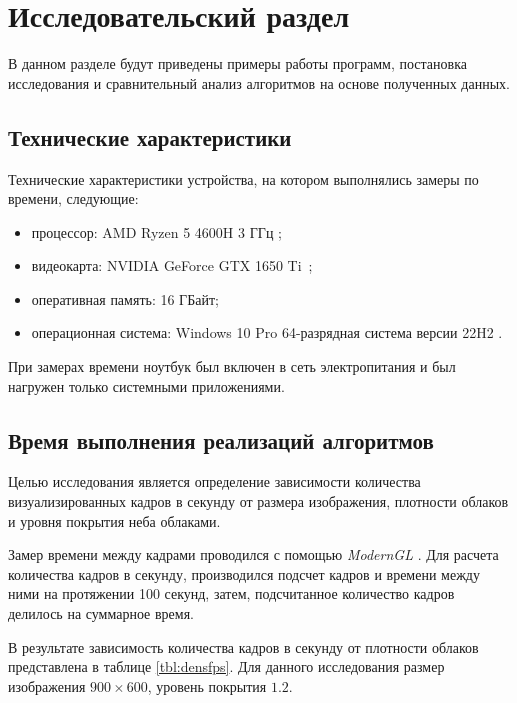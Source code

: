 \chapter{Исследовательский раздел}

В данном разделе будут приведены примеры работы программ, постановка исследования и сравнительный анализ алгоритмов на основе полученных данных.

\section{Технические характеристики}

Технические характеристики устройства, на котором выполнялись замеры по времени, следующие:
\begin{itemize}
	\item процессор: AMD Ryzen 5 4600H 3 ГГц \cite{amd};
	\item видеокарта: NVIDIA GeForce GTX 1650 Ti~\cite{nvidia};
	\item оперативная память: 16 ГБайт;
	\item операционная система: Windows 10 Pro 64-разрядная система версии 22H2 \cite{windows}.
\end{itemize}

При замерах времени ноутбук был включен в сеть электропитания и был нагружен только системными приложениями.

\section{Время выполнения реализаций алгоритмов}

Целью исследования является определение зависимости количества визуализированных кадров в секунду от размера изображения, плотности облаков и уровня покрытия неба облаками.

Замер времени между кадрами проводился с помощью \textit{ModernGL} \cite{moderngl}. Для расчета количества кадров в секунду, производился подсчет кадров и времени между ними на протяжении 100 секунд, затем, подсчитанное количество кадров делилось на суммарное время.

В результате зависимость количества кадров в секунду от плотности облаков представлена в таблице \ref{tbl:densfps}. Для данного исследования размер изображения $900 \times 600$, уровень покрытия $1.2$.

